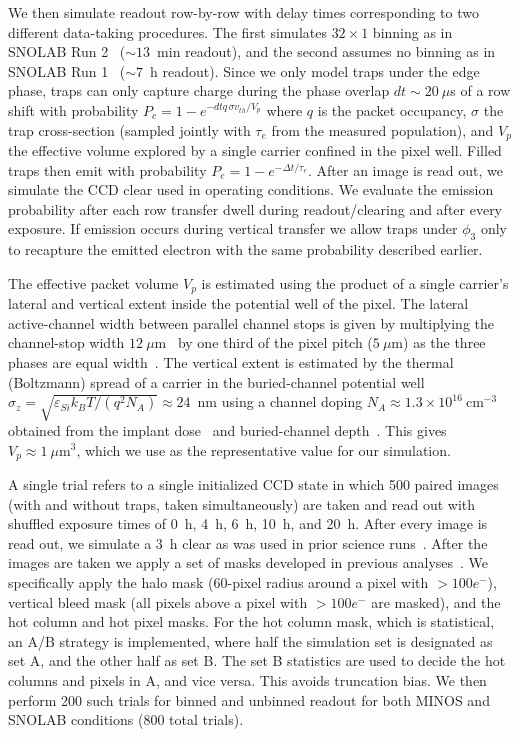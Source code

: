 \documentclass[aps, prapplied,twocolumn,showpacs,superscriptaddress,preprintnumbers, longbibliography,nofootinbib,floatfix]{revtex4-2}
\begin{document}
We then simulate readout row-by-row with delay times corresponding to two different data-taking procedures.
The first simulates $32 \times 1$ binning as in SNOLAB Run 2~\cite{SENSEI:2024yyt} ($\sim13$~min readout), and the second assumes no binning as in SNOLAB Run 1~\cite{SENSEI:2023zdf} ($\sim7$~h readout). 
Since we only model traps under the edge phase, traps can only capture charge during the phase overlap $dt\sim20~\mu$s of a row shift with probability $P_c = 1-e^{- dt q\,\sigma v_{th}/V_p}$ where $q$ is the packet occupancy, $\sigma$ the trap cross-section (sampled jointly with $\tau_e$ from the measured population), and $V_p$ the effective volume explored by a single carrier confined in the pixel well. 
Filled traps then emit with probability $P_e = 1-e^{-\Delta t/\tau_e}$. 
After an image is read out, we simulate the CCD clear used in operating conditions. 
We evaluate the emission probability after each row transfer dwell during readout/clearing and after every exposure. 
If emission occurs during vertical transfer we allow traps under $\phi_3$ only to recapture the emitted electron with the same probability described earlier. 

The effective packet volume $V_p$ is estimated using the product of a single carrier's lateral and vertical extent inside the potential well of the pixel. 
The lateral active-channel width between parallel channel stops is given by multiplying the channel-stop width $12~\mu\mathrm{m}$~\cite{wu_characterization_2026} by one third of the pixel pitch ($5~\mu\mathrm{m}$) as the three phases are equal width~\cite{Holland:2003}. 
The vertical extent is estimated by the thermal (Boltzmann) spread of a carrier in the buried-channel potential well $\sigma_z=\sqrt{\varepsilon_{Si}k_BT/(q^2N_A)}\approx24$~nm using a channel doping $N_A\approx1.3\times10^{16}~\mathrm{cm}^{-3}$ obtained from the implant dose~\cite{Holland:2003} and buried-channel depth~\cite{wu_characterization_2026}. 
This gives $V_p\approx1~\mu\mathrm{m}^3$, which we use as the representative value for our simulation. 

A single trial refers to a single initialized CCD state in which 500 paired images (with and without traps, taken simultaneously) are taken and read out with shuffled exposure times of 0~h, 4~h, 6~h, 10~h, and 20~h.  
After every image is read out, we simulate a 3~h clear as was used in prior science runs~\cite{SENSEI:2023zdf,SENSEI:2024yyt}. 
After the images are taken we apply a set of masks developed in previous analyses~\cite{Sensei2020,SENSEI:2023zdf,SENSEI:2024yyt}. 
We specifically apply the halo mask (60-pixel radius around a pixel with $>100e^-$), vertical bleed mask (all pixels above a pixel with $>100e^-$ are masked), and the hot column and hot pixel masks. 
For the hot column mask, which is statistical, an A/B strategy is implemented, where half the simulation set is designated as set A, and the other half as set B. 
The set B statistics are used to decide the hot columns and pixels in A, and vice versa. 
This avoids truncation bias. 
We then perform 200 such trials for binned and unbinned readout for both MINOS and SNOLAB conditions (800 total trials).
\end{document}
